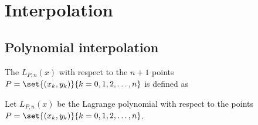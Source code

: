 ﻿%




\chapter{Interpolation}
\section{Polynomial interpolation}
\begin{definition}
\label{def:Ln(x)}
The  $L_{P,n}(x)$ with respect to the $n+1$ points \\
$P=\set{(x_k,y_k)}{k=0,1,2,\ldots,n}$ is defined as
\end{definition}

\begin{proposition}
Let $L_{P,n}(x)$ be the Lagrange polynomial with respect to the points\\
$P=\set{(x_k,y_k)}{k=0,1,2,\ldots,n}$.
\end{proposition}

